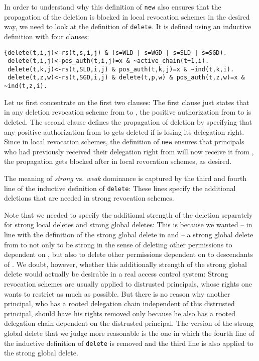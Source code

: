 \documentclass[runningheads]{llncs}
\begin{document}
In order to understand why this definition of \texttt{new} also ensures that the propagation of the deletion is blocked in local revocation schemes in the desired way, we need to look at the definition of \texttt{delete}. It is defined using an inductive definition with four clauses:
\vspace{-3mm}
\begin{lstlisting}[caption={The definition of \texttt{delete} captures the dominance dimension},label={delete}]
{delete(t,i,j)<-rs(t,s,i,j) & (s=WLD | s=WGD | s=SLD | s=SGD).
 delete(t,i,j)<-pos_auth(t,i,j)=x & ~active_chain(t+1,i).
 delete(t,k,j)<-rs(t,SLD,i,j) & pos_auth(t,k,j)=x & ~ind(t,k,i).
 delete(t,z,w)<-rs(t,SGD,i,j) & delete(t,p,w) & pos_auth(t,z,w)=x & ~ind(t,z,i).
\end{lstlisting}
Let us first concentrate on the first two clauses: The first clause just states that in any deletion revocation scheme from  to , the positive authorization from  to  is deleted. The second clause defines the propagation of deletion by specifying that any positive authorization from  to  gets deleted if  is losing its delegation right. Since in local revocation schemes, the definition of \texttt{new} ensures that principals who had previously received their delegation right from  will now receive it from , the propagation gets blocked after  in local revocation schemes, as desired.

The meaning of \emph{strong} vs. \emph{weak} dominance is captured by the third and fourth line of the inductive definition of \texttt{delete}: These lines specify the additional deletions that are needed in strong revocation schemes. 

Note that we needed to specify the additional strength of the deletion separately for strong local deletes and strong global deletes: This is because we wanted -- in line with the definition of the strong global delete in \cite{Hagstrom} and \cite{Aucher} -- a strong global delete from  to  not only to be strong in the sense of deleting other permissions to  dependent on , but also to delete other permissions dependent on  to descendants of . We doubt, however, whether this additionally strength of the strong global delete would actually be desirable in a real access control system: Strong revocation schemes are usually applied to distrusted principals, whose rights one wants to restrict as much as possible. But there is no reason why another principal, who has a rooted delegation chain independent of this distrusted principal, should have his rights removed only because he also has a rooted delegation chain dependent on the distrusted principal. The version of the strong global delete that 
we judge more reasonable is the one in which the fourth line of the inductive definition of \texttt{delete} is removed and the third line is also applied to the strong global delete.
\end{document}

